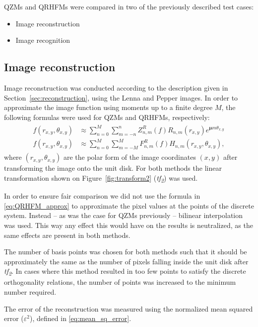 QZMs and QRHFMs were compared in two of the previously described test cases:
\begin{itemize}
	\item Image reconstruction
	\item Image recognition
\end{itemize}

\subsection{Image reconstruction}
Image reconstruction was conducted according to the description given in Section~\ref{sec:reconstruction}, using the Lenna and Pepper images. In order to approximate the image function using moments up to a finite degree $M$, the following formulas were used for QZMs and QRHFMs, respectively:
\begin{gather*}
    \begin{split}
    f(r_{x,y},\theta_{x,y}) &\approx \sum_{n=0}^{M}\sum_{m=-n}^{n}Z_{n,m}^R(f)R_{n,m}(r_{x,y})e^{\bm{\mu}m\theta_{x,y}} \\
    f(r_{x,y},\theta_{x,y}) &\approx \sum_{n=0}^{M}\sum_{m=-M}^{M}F_{n,m}^R(f)H_{n,m}(r_{x,y},\theta_{x,y}),
    \end{split}
\end{gather*}
where $(r_{x,y}, \theta_{x,y})$ are the polar form of the image coordinates $(x,y)$ after transforming the image onto the unit disk. For both methods the linear transformation shown on Figure~\ref{fig:transform2} (\textit{tf\textsubscript{2}}) was used.

In order to ensure fair comparison we did not use the formula in \eqref{eq:QRHFM_approx} to approximate the pixel values at the points of the discrete system. Instead -- as was the case for QZMs previously -- bilinear interpolation was used. This way any effect this would have on the results is neutralized, as the same effects are present in both methods.

The number of basis points was chosen for both methods such that it should be approximately the same as the number of pixels falling inside the unit disk after \textit{tf\textsubscript{2}}. In cases where this method resulted in too few points to satisfy the discrete orthogonality relations, the number of points was increased to the minimum number required.

The error of the reconstruction was measured using the normalized mean squared error ($\varepsilon^2$), defined in \eqref{eq:mean_sq_error}.

